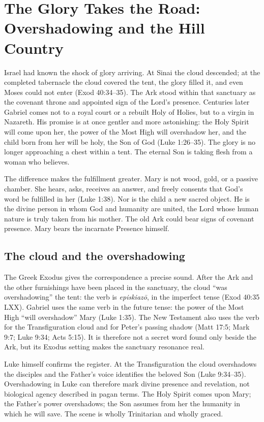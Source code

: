\section{The Glory Takes the Road: Overshadowing and the Hill Country}

Israel had known the shock of glory arriving.  At Sinai the cloud descended;
at the completed tabernacle the cloud covered the tent, the glory filled it,
and even Moses could not enter (Exod 40:34--35).  The Ark stood within that
sanctuary as the covenant throne and appointed sign of the Lord's presence.
Centuries later Gabriel comes not to a royal court or a rebuilt Holy of Holies,
but to a virgin in Nazareth.  His promise is at once gentler and more
astonishing: the Holy Spirit will come upon her, the power of the Most High
will overshadow her, and the child born from her will be holy, the Son of God
(Luke 1:26--35).  The glory is no longer approaching a chest within a tent.
The eternal Son is taking flesh from a woman who believes.

The difference makes the fulfillment greater.  Mary is not wood, gold, or a
passive chamber.  She hears, asks, receives an answer, and freely consents that
God's word be fulfilled in her (Luke 1:38).  Nor is the child a
new sacred object.  He is the divine person in whom God and humanity are
united, the Lord whose human nature is truly taken from his mother.  The old
Ark could bear signs of covenant presence.  Mary bears the incarnate Presence
himself.

\subsection{The cloud and the overshadowing}

The Greek Exodus gives the correspondence a precise sound.  After the Ark and
the other furnishings have been placed in the sanctuary, the cloud ``was
overshadowing'' the tent: the verb is \emph{episkiazō}, in the imperfect tense
(Exod 40:35 LXX).  Gabriel uses the same verb in the future tense: the power of
the Most High ``will overshadow'' Mary (Luke 1:35).  The New Testament also
uses the verb for the Transfiguration cloud and for Peter's passing shadow
(Matt 17:5; Mark 9:7; Luke 9:34; Acts 5:15).  It is therefore not a secret word
found only beside the Ark, but its Exodus setting makes the sanctuary resonance
real.

Luke himself confirms the register.  At the Transfiguration the cloud
overshadows the disciples and the Father's voice identifies the beloved Son
(Luke 9:34--35).  Overshadowing in Luke can therefore mark divine presence and
revelation, not biological agency described in pagan terms.  The Holy Spirit
comes upon Mary; the Father's power overshadows; the Son assumes from her the
humanity in which he will save.  The scene is wholly Trinitarian and wholly
graced.

